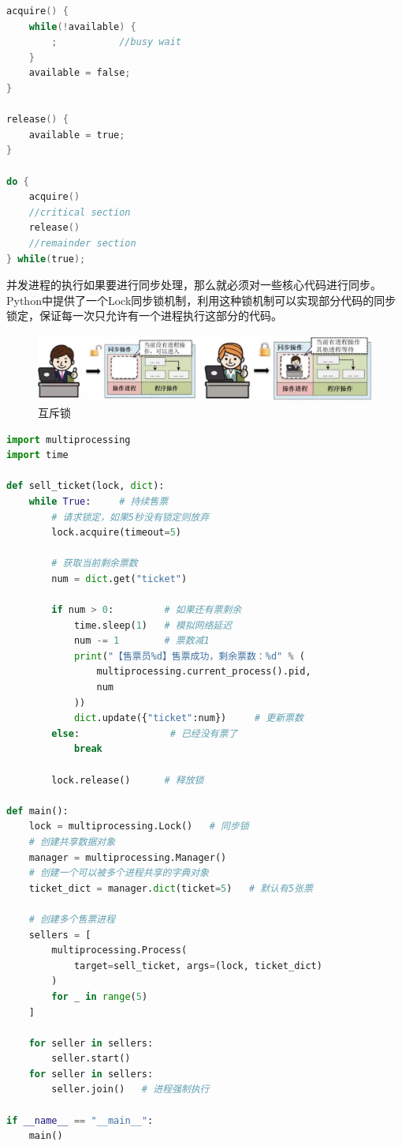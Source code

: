 \begin{lstlisting}[language=C]
acquire() {
	while(!available) {
		;			//busy wait
	}
	available = false;
}

release() {
	available = true;
}

do {
	acquire()
	//critical section
	release()
	//remainder section
} while(true);
\end{lstlisting}

并发进程的执行如果要进行同步处理，那么就必须对一些核心代码进行同步。Python中提供了一个Lock同步锁机制，利用这种锁机制可以实现部分代码的同步锁定，保证每一次只允许有一个进程执行这部分的代码。

\begin{figure}[H]
	\centering
	\includegraphics[]{img/C2/2-6/1.png}
	\caption{互斥锁}
\end{figure}

\begin{lstlisting}[language=Python]
import multiprocessing
import time

def sell_ticket(lock, dict):
	while True:     # 持续售票
		# 请求锁定，如果5秒没有锁定则放弃
		lock.acquire(timeout=5)
		
		# 获取当前剩余票数
		num = dict.get("ticket")
		
		if num > 0:         # 如果还有票剩余
			time.sleep(1)   # 模拟网络延迟
			num -= 1        # 票数减1
			print("【售票员%d】售票成功，剩余票数：%d" % (
				multiprocessing.current_process().pid,
				num
			))
			dict.update({"ticket":num})     # 更新票数
		else:                # 已经没有票了
			break
		
		lock.release()      # 释放锁

def main():
	lock = multiprocessing.Lock()   # 同步锁
	# 创建共享数据对象
	manager = multiprocessing.Manager()
	# 创建一个可以被多个进程共享的字典对象
	ticket_dict = manager.dict(ticket=5)   # 默认有5张票

	# 创建多个售票进程
	sellers = [
		multiprocessing.Process(
			target=sell_ticket, args=(lock, ticket_dict)
		) 
		for _ in range(5)
	]

	for seller in sellers:
		seller.start()
	for seller in sellers:
		seller.join()   # 进程强制执行

if __name__ == "__main__":
	main()
\end{lstlisting}


